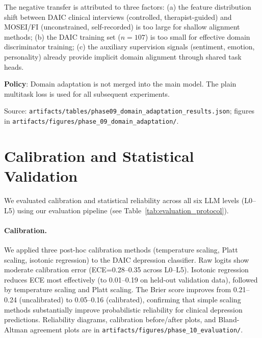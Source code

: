 \documentclass[12pt,oneside]{book}
\begin{document}
The negative transfer is attributed to three factors: (a) the feature distribution shift between DAIC clinical interviews (controlled, therapist-guided) and MOSEI/FI (unconstrained, self-recorded) is too large for shallow alignment methods; (b) the DAIC training set ($n=107$) is too small for effective domain discriminator training; (c) the auxiliary supervision signals (sentiment, emotion, personality) already provide implicit domain alignment through shared task heads.

\textbf{Policy}: Domain adaptation is not merged into the main model. The plain multitask loss is used for all subsequent experiments.

Source: \texttt{artifacts/tables/phase09\_domain\_adaptation\_results.json}; figures in \texttt{artifacts/figures/phase\_09\_domain\_adaptation/}.

\section{Calibration and Statistical Validation}
\label{sec:calibration}
We evaluated calibration and statistical reliability across all six LLM levels (L0--L5) using our evaluation pipeline (see Table~\ref{tab:evaluation_protocol}).

\paragraph{Calibration.} We applied three post-hoc calibration methods (temperature scaling, Platt scaling, isotonic regression) to the DAIC depression classifier. Raw logits show moderate calibration error (ECE=0.28--0.35 across L0--L5). Isotonic regression reduces ECE most effectively (to 0.01--0.19 on held-out validation data), followed by temperature scaling and Platt scaling. The Brier score improves from 0.21--0.24 (uncalibrated) to 0.05--0.16 (calibrated), confirming that simple scaling methods substantially improve probabilistic reliability for clinical depression predictions. Reliability diagrams, calibration before/after plots, and Bland-Altman agreement plots are in \texttt{artifacts/figures/phase\_10\_evaluation/}.
\end{document}
